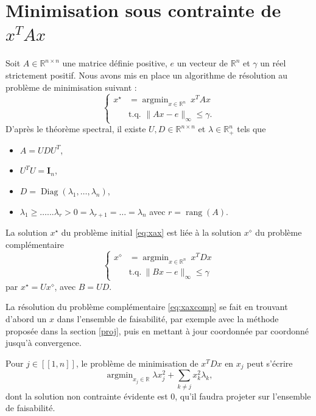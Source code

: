 \documentclass[12pt,a4paper]{reedthesis}
\newcommand \RR {\mathbb{R}}
\DeclareMathOperator*{\argmin}{argmin}
\DeclareMathOperator*{\diag}{Diag}
\DeclareMathOperator*{\rang}{rang}
\theoremstyle{definition}
\theoremstyle{definition}
\theoremstyle{definition}
\theoremstyle{remark}
\begin{document}
\hypertarget{mam}{%
\section{\texorpdfstring{Minimisation sous contrainte de \(x^TAx\)}{Minimisation sous contrainte de x\^{}TAx}}\label{mam}}

Soit \(A \in \RR^{n\times n}\) une matrice définie positive, \(e\) un vecteur de \(\RR^n\) et \(\gamma\) un réel strictement positif. Nous avons mis en place un algorithme de résolution au problème de minimisation suivant :
\begin{equation}
\label{eq:xax}
\left\{
  \begin{aligned}
    x^\star & = \argmin_{x \in \mathbb{R}^{n}} \ x^TAx \\
    &\text{t.q. }\|Ax - e\|_{\infty} \leq \gamma.
  \end{aligned}
\right.
\end{equation}
D'après le théorème spectral, il existe \(U, D \in \RR^{n\times n}\) et \(\lambda \in \RR_+^n\) tels que
\begin{itemize}
\item
  \(A = UDU^T\),
\item
  \(U^TU = \mathbf{I}_n\),
\item
  \(D = \diag\left(\lambda_1, \ldots, \lambda_n\right)\),
\item
  \(\lambda_1 \geq \dots ... \lambda_r > 0 = \lambda_{r+1} = \dots = \lambda_{n}\) avec \(r = \rang(A)\).
\end{itemize}
La solution \(x^{\star}\) du problème initial \eqref{eq:xax} est liée à la solution \(x^{\diamond}\) du problème complémentaire
\begin{equation}
\label{eq:xaxcomp}
\left\{
  \begin{aligned}
    x^\diamond & = \argmin_{x \in \mathbb{R}^{n}} \ x^TDx \\
    &\text{t.q.}\  \|Bx - e\|_{\infty} \leq \gamma
  \end{aligned}
\right.
\end{equation}
par \(x^\star = Ux^\diamond\), avec \(B = UD\).

La résolution du problème complémentaire \eqref{eq:xaxcomp} se fait en trouvant d'abord un \(x\) dans l'ensemble de faisabilité, par exemple avec la méthode proposée dans la section \ref{proj}, puis en mettant à jour coordonnée par coordonné jusqu'à convergence.

Pour \(j \in [\![1,n]\!]\), le problème de minimisation de \(x^TDx\) en \(x_j\) peut s'écrire
\begin{equation*}
\argmin_{x_j \in \RR} \lambda x_j^2 + \sum_{k\neq j}x_k^2\lambda_k,
\end{equation*}
dont la solution non contrainte évidente est \(0\), qu'il faudra projeter sur l'ensemble de faisabilité.
\end{document}
